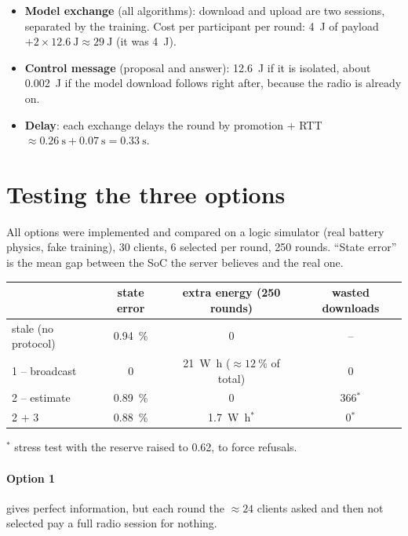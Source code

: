 \documentclass[11pt,a4paper]{article}
\begin{document}
\begin{itemize}
  \item \textbf{Model exchange} (all algorithms): download and upload are two
        sessions, separated by the training. Cost per participant per round:
        \SI{4}{\joule} of payload $+ 2\times\SI{12.6}{\joule} \approx \SI{29}{\joule}$
        (it was \SI{4}{\joule}).
  \item \textbf{Control message} (proposal and answer): \SI{12.6}{\joule} if it is
        isolated, about \SI{0.002}{\joule} if the model download follows right
        after, because the radio is already on.
  \item \textbf{Delay}: each exchange delays the round by promotion $+$ RTT
        $\approx \SI{0.26}{\second} + \SI{0.07}{\second} = \SI{0.33}{\second}$.
\end{itemize}

\section{Testing the three options}

All options were implemented and compared on a logic simulator (real battery
physics, fake training), 30 clients, 6 selected per round, 250 rounds.
\enquote{State error} is the mean gap between the SoC the server believes and
the real one.

\begin{center}
\begin{tabular}{lccc}
\toprule
 & state error & extra energy (250 rounds) & wasted downloads \\
\midrule
stale (no protocol) & \SI{0.94}{\percent} & 0 & -- \\
1 -- broadcast & 0 & \SI{21}{\watt\hour} ($\approx\SI{12}{\percent}$ of total) & 0 \\
2 -- estimate & \SI{0.89}{\percent} & 0 & 366$^{*}$ \\
2 $+$ 3 & \SI{0.88}{\percent} & \SI{1.7}{\watt\hour}$^{*}$ & 0$^{*}$ \\
\bottomrule
\end{tabular}

\smallskip
{\footnotesize $^{*}$ stress test with the reserve raised to 0.62, to force refusals.}
\end{center}

\paragraph{Option 1} gives perfect information, but each round the $\approx 24$
clients asked and then not selected pay a full radio session for nothing.
\end{document}
